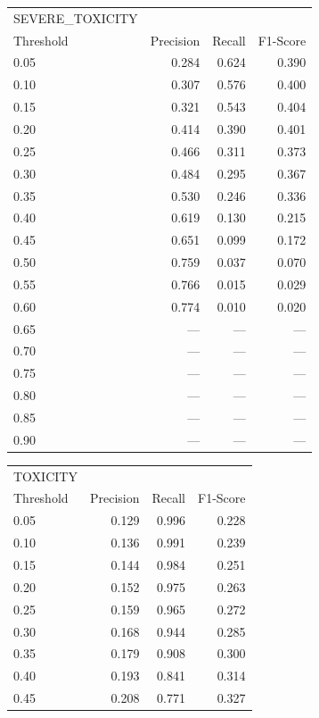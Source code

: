 \begin{table}[t]
\centering
\scriptsize
\begin{tabular}{lrrr}
\toprule
   SEVERE\_TOXICITY \\
   Threshold &   Precision &  Recall  &    F1-Score  \\ \midrule
      0.05 & 0.284 & 0.624 & 0.390 \\  
      0.10  &0.307& 0.576 & 0.400\\
      0.15 & 0.321&0.543 & 0.404 \\
      0.20 &0.414 & 0.390 &0.401 \\
      0.25& 0.466 & 0.311& 0.373 \\
      0.30& 0.484 & 0.295 & 0.367 \\
      0.35& 0.530 & 0.246 & 0.336 \\
      0.40 & 0.619 &  0.130 & 0.215 \\
      0.45 & 0.651 &  0.099 & 0.172\\
      0.50 & 0.759 & 0.037 & 0.070\\
      0.55 & 0.766 & 0.015 & 0.029\\
      0.60 & 0.774 & 0.010 &0.020\\
      0.65 & --- & ---  &--- \\
      0.70 & ---  & ---  &--- \\
       0.75 & ---  & ---  &--- \\
       0.80 & ---  & ---  &--- \\
       0.85 & ---  & ---  &--- \\
       0.90 & ---  & ---  &--- \\
\end{tabular}
\begin{tabular}{lrrr}
\toprule
   TOXICITY \\
   Threshold &   Precision &  Recall  &    F1-Score  \\ \midrule
      0.05 & 0.129 & 0.996& 0.228 \\  
      0.10  &0.136& 0.991 & 0.239\\
      0.15 & 0.144&0.984 & 0.251 \\
      0.20 &0.152 & 0.975 &0.263 \\
      0.25& 0.159 & 0.965& 0.272\\
      0.30& 0.168 & 0.944 & 0.285 \\
      0.35& 0.179 & 0.908 & 0.300 \\
      0.40 & 0.193 &  0.841 & 0.314 \\
      0.45 & 0.208 &  0.771 & 0.327\\

\end{tabular}
\end{table}
